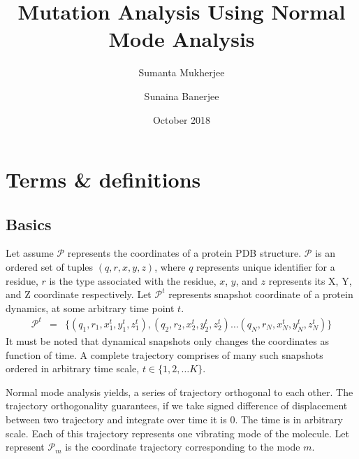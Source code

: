 \documentclass{article}
\title{Mutation Analysis Using Normal Mode Analysis }
\author{{Sumanta Mukherjee} \and {Sunaina Banerjee}}
\date{October 2018}
\begin{document}
\maketitle

\section{Terms \& definitions }
\subsection{Basics}
Let assume $\mathscr{P}$ represents the coordinates of a protein PDB structure. $\mathscr{P}$ is an ordered set of tuples $(q, r, x, y, z)$, where $q$ represents unique identifier for a residue, $r$ is the type associated with the residue, $x$, $y$, and $z$ represents its X, Y, and Z coordinate respectively. Let $\mathscr{P}^{t}$ represents snapshot coordinate of a protein dynamics, at some arbitrary time point $t$. 
\begin{eqnarray*}
  \mathscr{P}^{t} & = & \Big\lbrace (q_{1},r_{1},x^{t}_{1},y^{t}_{1},z^{t}_{1}), (q_{2},r_{2},x^{t}_{2},y^{t}_{2},z^{t}_{2}) \dots (q_{N},r_{N},x^{t}_{N},y^{t}_{N},z^{t}_{N}) \Big\rbrace
\end{eqnarray*}
 It must be noted that dynamical snapshots only changes the coordinates as function of time. A complete trajectory comprises of many such snapshots ordered in arbitrary time scale, $t \in \lbrace 1, 2, \dots K \rbrace$.
 \par
 Normal mode analysis yields, a series of trajectory orthogonal to each other. The trajectory orthogonality guarantees, if we take signed difference of displacement between two trajectory and integrate over time it is $0$. The time is in arbitrary scale. Each of this trajectory represents one vibrating mode of the molecule. Let represent $\mathbf{\mathscr{P}}_{m}$ is the coordinate trajectory corresponding to the mode $m$.
\end{document}
